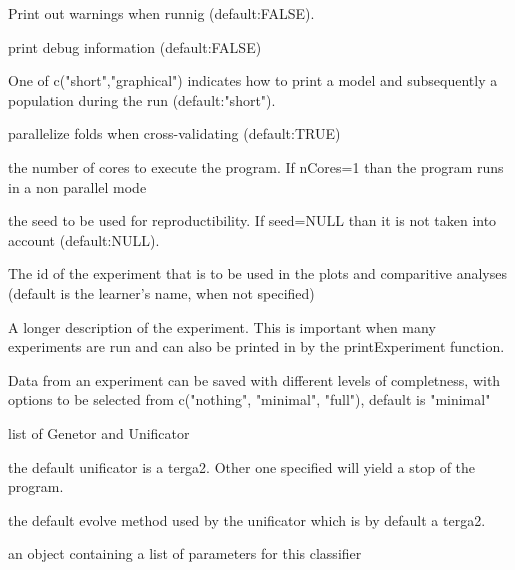 \documentclass[a4paper]{book}
\begin{document}
\begin{Arguments}
\begin{ldescription}
\item[\code{warnings:}] Print out warnings when runnig (default:FALSE).

\item[\code{debug:}] print debug information (default:FALSE)

\item[\code{print\_ind\_method:}] One of c("short","graphical") indicates how to print a model and subsequently a population during the run (default:"short").

\item[\code{parallelize.folds:}] parallelize folds when cross-validating (default:TRUE)

\item[\code{nCores:}] the number of cores to execute the program. If nCores=1 than the program runs in a non parallel mode

\item[\code{seed:}] the seed to be used for reproductibility. If seed=NULL than it is not taken into account (default:NULL).

\item[\code{experiment.id:}] The id of the experiment that is to be used in the plots and comparitive analyses (default is the learner's name, when not specified)

\item[\code{experiment.description:}] A longer description of the experiment. This is important when many experiments are run and can also be printed in by the printExperiment function.

\item[\code{experiment.save:}] Data from an experiment can be saved with different levels of completness, with options to be selected from c("nothing", "minimal", "full"), default is "minimal"

\item[\code{list.clfs:}] list of Genetor and Unificator

\item[\code{unificator.method:}] the default unificator is a terga2. Other one specified will yield a stop of the program.

\item[\code{unificator.evolver:}] the default evolve method used by the unificator which is by default a terga2.
\end{ldescription}
\end{Arguments}
%
\begin{Value}
an object containing a list of parameters for this classifier
\end{Value}
\end{document}
